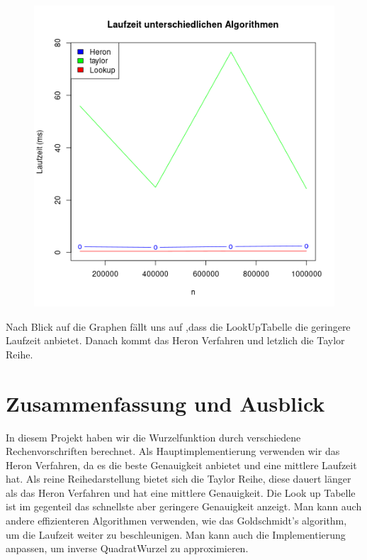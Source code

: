 \documentclass[course=erap]{aspdoc}
\begin{document}
\begin{figure}[H]
\begin{minipage}{.4\textwidth}
        \label{fig:test4}
    \end{minipage}%
    \begin{minipage}{.4\textwidth}
        \centering
        \includegraphics[width=.9\linewidth]{graphs/Allalgorithms.png}
        \label{fig:test5}
    \end{minipage}

\end{figure}
Nach Blick auf die Graphen fällt uns auf ,dass die LookUpTabelle die geringere Laufzeit anbietet. Danach kommt das Heron Verfahren
und letzlich die Taylor Reihe.

\section{Zusammenfassung und Ausblick}
In diesem Projekt haben wir die Wurzelfunktion durch verschiedene Rechenvorschriften
berechnet. Als Hauptimplementierung  verwenden wir das Heron Verfahren, da es die beste
Genauigkeit anbietet und eine mittlere Laufzeit hat. Als reine Reihedarstellung bietet sich die Taylor Reihe,
diese dauert länger als das Heron Verfahren und hat eine mittlere Genauigkeit.
Die Look up Tabelle ist im gegenteil das schnellste aber geringere Genauigkeit anzeigt.
Man kann auch andere effizienteren Algorithmen verwenden, wie das Goldschmidt's algorithm, um
die Laufzeit weiter zu beschleunigen. Man kann auch die Implementierung anpassen,
um inverse QuadratWurzel zu approximieren.



{}
\end{document}
